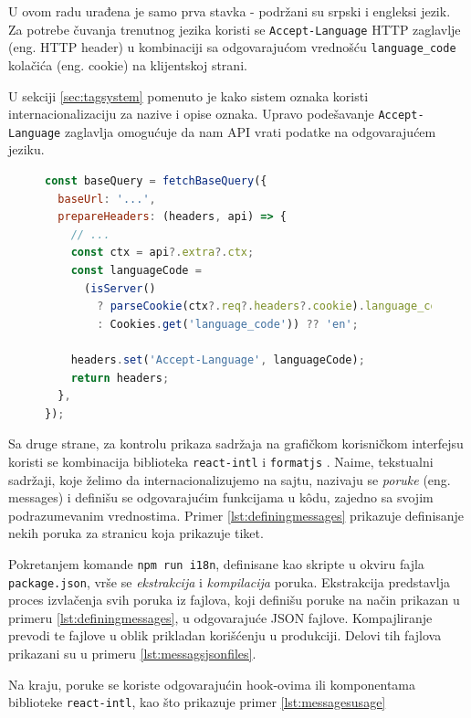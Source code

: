 \documentclass[12pt,oneside]{memoir}
\begin{document}
U ovom radu urađena je samo prva stavka - podržani su srpski i engleksi jezik. Za potrebe čuvanja trenutnog jezika koristi se \verb|Accept-Language| HTTP zaglavlje (eng. HTTP header) u kombinaciji sa odgovarajućom vrednošću \verb|language_code| kolačića (eng. cookie) na klijentskoj strani.

U sekciji \ref{sec:tagsystem} pomenuto je kako sistem oznaka koristi internacionalizaciju za nazive i opise oznaka. Upravo podešavanje \verb|Accept-Language| zaglavlja omogućuje da nam API vrati podatke na odgovarajućem jeziku.

\begin{figure}[h]
\begin{lstlisting}[language=JavaScript, style=ES6, caption={Postavljanje Accept-Language zaglavlja u RTKQ prilikom API zahteva.}]
const baseQuery = fetchBaseQuery({
  baseUrl: '...',
  prepareHeaders: (headers, api) => {
    // ...
    const ctx = api?.extra?.ctx;
    const languageCode =
      (isServer()
        ? parseCookie(ctx?.req?.headers?.cookie).language_code ?? ''
        : Cookies.get('language_code')) ?? 'en';

    headers.set('Accept-Language', languageCode);
    return headers;
  },
});
\end{lstlisting}
\end{figure}

Sa druge strane, za kontrolu prikaza sadržaja na grafičkom korisničkom interfejsu koristi se kombinacija biblioteka \verb|react-intl| i \verb|formatjs| \cite{formatjsdocs}. Naime, tekstualni sadržaji, koje želimo da internacionalizujemo na sajtu, nazivaju se \textit{poruke} (eng. messages) i definišu se odgovarajućim funkcijama u k\^{o}du, zajedno sa svojim podrazumevanim vrednostima. Primer \ref{lst:definingmessages} prikazuje definisanje nekih poruka za stranicu koja prikazuje tiket.

Pokretanjem komande \verb|npm run i18n|, definisane kao skripte u okviru fajla \verb|package.json|, vrše se \textit{ekstrakcija} i \textit{kompilacija} poruka. Ekstrakcija predstavlja proces izvlačenja svih poruka iz fajlova, koji definišu poruke na način prikazan u primeru \ref{lst:definingmessages}, u odgovarajuće JSON fajlove. Kompajliranje prevodi te fajlove u oblik prikladan korišćenju u produkciji. Delovi tih fajlova prikazani su u primeru \ref{lst:messagsjsonfiles}.

Na kraju, poruke se koriste odgovarajućin hook-ovima ili komponentama biblioteke \verb|react-intl|, kao što prikazuje primer \ref{lst:messagesusage}
\end{document}
